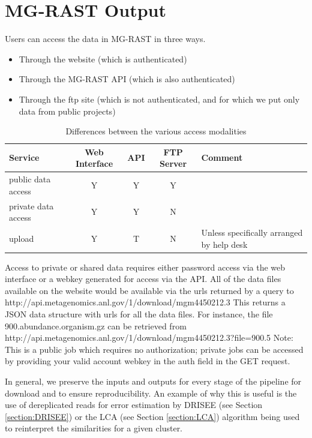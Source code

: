 \documentclass[12pt,fullpage]{report}
\begin{document}
\section{MG-RAST Output}

Users can access the data in MG-RAST in three ways.
\begin{itemize}
\item Through the website (which is authenticated)
\item Through the MG-RAST API (which is also authenticated)
\item Through the ftp site (which is not authenticated, and for which we put
only data from public projects)
\end{itemize}

\begin{table}
\caption{Differences between the various access modalities}
\label{table:access-modalities}
\begin{tabular}{l|c|c|c|l}
Service & Web Interface & API & FTP Server & Comment\\
 \hline
public data  access  	  &  Y                   &  Y     &  Y &\\
private data  access   &  Y                   &  Y     &  N &\\
upload                      &  Y                    &  T     & N & Unless specifically arranged by help desk\\
 \hline
\end{tabular}
\end{table}

Access to private or shared data requires either password access via the web interface or a webkey generated for access via the API.
All of the data files available on the website would be available via the urls returned by
a query to
http://api.metagenomics.anl.gov/1/download/mgm4450212.3
This returns a JSON data structure with urls for all the data files. For instance, the file
900.abundance.organism.gz
can be retrieved from
http://api.metagenomics.anl.gov/1/download/mgm4450212.3?file=900.5
Note: This is a public job which requires no authorization; private jobs can be accessed by providing your valid account webkey in the auth field in the GET request.

In general, we preserve the inputs and outputs for every stage of the pipeline for download and to ensure reproducibility.
An example of why this is useful is the use of dereplicated reads for error estimation by DRISEE (see Section \ref{section:DRISEE}) or the LCA (see Section \ref{section:LCA}) algorithm being used to reinterpret the similarities for a given cluster.
\end{document}
